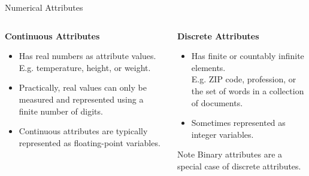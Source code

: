 \begin{frame}[c]{Numerical Attributes}
	\begin{columns}[t]
		\begin{column}{0.45\columnwidth}
			\centering \textbf{Continuous Attributes}
			\begin{itemize}
				\item Has real numbers as attribute values.\\
				      E.g. temperature, height, or weight.
				\item Practically, real values can only be measured and represented using a finite number of digits.
				\item Continuous attributes are typically represented as floating-point variables.
			\end{itemize}
		\end{column}
		\begin{column}{0.45\columnwidth}
			\centering \textbf{Discrete Attributes}
			\begin{itemize}
				\item Has finite or countably infinite elements.\\
				      E.g. ZIP code, profession, or the set of words in a collection of documents.
				\item Sometimes represented as integer variables.
			\end{itemize}
			\begin{alertblock}{Note}
				Binary attributes are a special case of discrete attributes.
			\end{alertblock}
		\end{column}
	\end{columns}
\end{frame}
